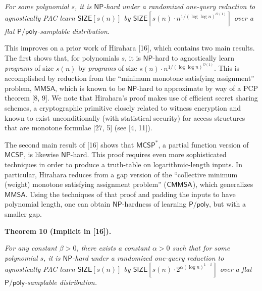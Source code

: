 \documentclass[10pt,a4paper]{article}
\begin{document}
\emph{For some polynomial $s$, it is ${\mathsf{NP}}$-hard under a randomized one-query reduction to agnostically PAC learn ${\mathsf{SIZE}}[s(n)]$ by ${\mathsf{SIZE}}[s(n)\cdot n^{1/(\log\log n)^{O(1)}}]$ over a flat ${\mathsf{P}}/{\mathsf{poly}}$-samplable distribution.}\par






This improves on a prior work of Hirahara [16], which contains two main results. The first shows that, for polynomials $s$, it is ${\mathsf{NP}}$-hard to agnostically learn \emph{programs} of size $s(n)$ by \emph{programs} of size $s(n)\cdot n^{1/(\log\log n)^{O(1)}}$. This is accomplished by reduction from the “minimum monotone satisfying assignment” problem, ${\mathsf{MMSA}}$, which is known to be ${\mathsf{NP}}$-hard to approximate by way of a PCP theorem [8, 9]. We note that Hirahara’s proof makes use of efficient secret sharing schemes, a cryptographic primitive closely related to witness encryption and known to exist unconditionally (with statistical security) for access structures that are monotone formulae [27, 5] (see [4, 11]).\par




The second main result of [16] shows that ${\mathsf{MCSP}}^{*}$, a partial function version of ${\mathsf{MCSP}}$, is likewise ${\mathsf{NP}}$-hard. This proof requires even more sophisticated techniques in order to produce a truth-table on logarithmic-length inputs. In particular, Hirahara reduces from a gap version of the “collective minimum (weight) monotone satisfying assignment problem” (${\sf CMMSA}$), which generalizes ${\mathsf{MMSA}}$. Using the techniques of that proof and padding the inputs to have polynomial length, one can obtain ${\mathsf{NP}}$-hardness of learning ${\mathsf{P}}/{\mathsf{poly}}$, but with a smaller gap.\par





\par\medskip\noindent\textbf{
\textbf{Theorem 10}\textbf{ }(Implicit in [16])\textbf{.}
}\par



\emph{For any constant $\beta>0$, there exists a constant $\alpha>0$ such that for some polynomial $s$, it is ${\mathsf{NP}}$-hard under a randomized one-query reduction to agnostically PAC learn ${\mathsf{SIZE}}[s(n)]$ by ${\mathsf{SIZE}}[s(n)\cdot 2^{\alpha(\log n)^{1-\beta}}]$ over a flat ${\mathsf{P}}/{\mathsf{poly}}$-samplable distribution.}\par
\end{document}
